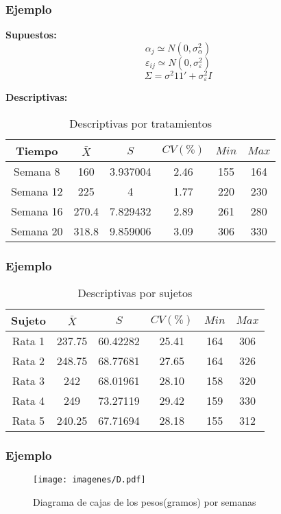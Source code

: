\documentclass[12pt]{beamer}
\begin{document}
\begin{frame}
\frametitle{Ejemplo}
\textbf{Supuestos:} 
$$\alpha_j \simeq N(0,\sigma^2_\alpha)$$
$$\varepsilon_{ij} \simeq N(0,\sigma^2_\varepsilon)$$
$$\Sigma =\sigma^2 11' + \sigma^2_\varepsilon I$$

\textbf{Descriptivas:}
\begin{table}[htbp]
  \centering
\resizebox{12cm}{!} {
\begin{tabular}{|c|c|c|c|c|c|}
\hline 
\textbf{Tiempo} & \textbf{$\bar{X}$} & \textbf{$S$} & \textbf{$CV(\%)$} & \textbf{$Min$} & \textbf{$Max$}\\ 
\hline 
Semana 8 & 160 &3.937004& 2.46& 155 & 164\\
Semana 12 & 225 &4& 1.77& 220 & 230\\
Semana 16 & 270.4 &7.829432& 2.89& 261 & 280\\
Semana 20 & 318.8 &9.859006& 3.09& 306 & 330 \\
\hline 
\end{tabular} 
}
\caption{Descriptivas por tratamientos}
\label{tab:addlabel}%
\end{table}%
\end{frame}

\begin{frame}
\frametitle{Ejemplo}
\begin{table}[htbp]
  \centering
\resizebox{12cm}{!} {
\begin{tabular}{|c|c|c|c|c|c|}
\hline 
\textbf{Sujeto} & \textbf{$\bar{X}$} & \textbf{$S$} & \textbf{$CV(\%)$} & \textbf{$Min$} & \textbf{$Max$}\\ 
\hline 
Rata 1 & 237.75 &60.42282 & 25.41& 164 & 306\\
Rata 2 & 248.75 &68.77681 & 27.65& 164 & 326\\
Rata 3 & 242    &68.01961 & 28.10& 158 & 320\\
Rata 4 & 249    &73.27119 & 29.42& 159 & 330 \\
Rata 5 & 240.25 &67.71694 & 28.18& 155 & 312 \\
\hline 
\end{tabular} 
}
\caption{Descriptivas por sujetos}
\label{tab:addlabel}%
\end{table}%
\end{frame}

\begin{frame}
\frametitle{Ejemplo}
\begin{figure}[h!]
\caption{Diagrama de cajas de los pesos(gramos) por semanas}
  \centering
  \texttt{[image: imagenes/D.pdf]}
\end{figure}
\end{frame}
\end{document}
